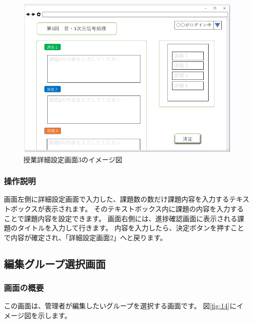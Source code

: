 \begin{figure}[htbp]
\begin{center}
  \includegraphics[width=1\linewidth,clip]{./img/13.png}
  \caption{授業詳細設定画面3のイメージ図}\label{fig:13}
\end{center}
\end{figure}

\subsubsection{操作説明}
画面左側に詳細設定画面で入力した、課題数の数だけ課題内容を入力するテキストボックスが表示されます。
そのテキストボックス内に課題の内容を入力することで課題内容を設定できます。
画面右側には、進捗確認画面に表示される課題のタイトルを入力して行きます。
内容を入力したら、決定ボタンを押すことで内容が確定され、「詳細設定画面2」へと戻ります。

\newpage

\subsection{編集グループ選択画面}
\subsubsection{画面の概要}
この画面は、管理者が編集したいグループを選択する画面です。
図\ref{fig:14}にイメージ図を示します。


